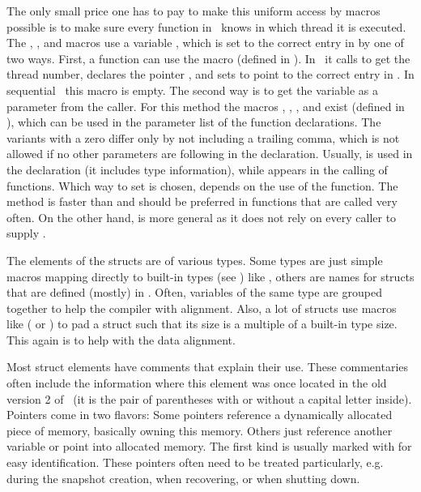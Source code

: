 The only small price one has to pay to make this uniform access by macros possible is to make sure
every function in \FORM\ knows in which thread it is executed. The , , and  macros
use a variable , which is set to the correct entry in  by one of two ways. First, a
function can use the macro  (defined in ).  In \TFORM\, it calls
 to get the thread number, declares the pointer , and sets  to point to the
correct entry in . In sequential \FORM\ this macro is empty. The second way is to get the
variable  as a parameter from the caller. For this method the macros , ,
, and  exist (defined in ), which can be used in the parameter list of
the function declarations. The variants with a zero differ only by not including a trailing comma,
which is not allowed if no other parameters are following in the declaration. Usually,  is
used in the declaration (it includes type information), while  appears in the calling of
functions. Which way to set  is chosen, depends on the use of the function. The  method
is faster than  and should be preferred in functions that are called very often. On
the other hand,  is more general as it does not rely on every caller to supply . 

The elements of the structs are of various types. Some types are just simple macros mapping directly
to built-in types (see ) like , others are names for structs that are defined
(mostly) in . Often, variables of the same type are grouped together to help the
compiler with alignment. Also, a lot of structs use macros like  ( or
) to pad a struct such that its size is a multiple of a built-in type size. This again
is to help with the data alignment.

Most struct elements have comments that explain their use. These commentaries often include 
the information where this element was once located in the old version 2 of \FORM\ (it is the pair
of parentheses with or without a capital letter inside). Pointers come in two flavors: Some
pointers reference a dynamically allocated piece of memory, basically owning this memory. Others
just reference another variable or point into allocated memory. The first kind is usually marked
with \C{[D]} for easy identification. These pointers often need to be treated particularly, e.g. during the
snapshot creation, when recovering, or when shutting down.

